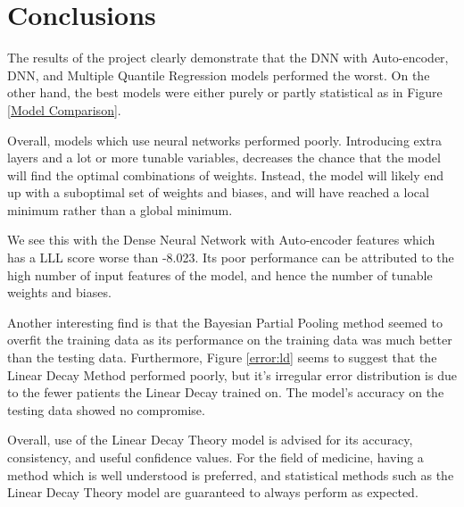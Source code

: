 \documentclass[12pt]{article}
\begin{document}
\section{Conclusions}


The results of the project clearly demonstrate that the DNN with Auto-encoder, DNN, and Multiple Quantile Regression models performed the worst.
On the other hand, the best models were either purely or partly statistical as in Figure \ref{Model Comparison}. 

Overall, models which use neural networks performed poorly.
Introducing extra layers and a lot or more tunable variables, decreases the chance that the model will find the optimal combinations of weights.
Instead, the model will likely end up with a suboptimal set of weights and biases, and will have reached a local minimum rather than a global minimum.

We see this with the Dense Neural Network with Auto-encoder features which has a LLL score worse than -8.023.
Its poor performance can be attributed to the high number of input features of the model, and hence the number of tunable weights and biases.

Another interesting find is that the Bayesian Partial Pooling method seemed to overfit the training data as its performance on the training data was much better than the testing data.
Furthermore, Figure \ref{error:ld} seems to suggest that the Linear Decay Method performed poorly, but it's irregular error distribution is due to the fewer patients the Linear Decay trained on.
The model's accuracy on the testing data showed no compromise.

Overall, use of the Linear Decay Theory model is advised for its accuracy, consistency, and useful confidence values.
For the field of medicine, having a method which is well understood is preferred, and statistical methods such as the Linear Decay Theory model are guaranteed to always perform as expected.
\end{document}
